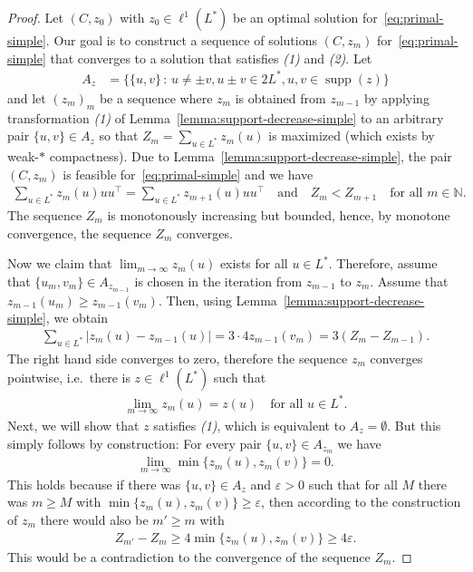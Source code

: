 \documentclass{amsart}
\newcommand{\N}{\mathbb{N}}
\DeclareMathOperator{\supp}{supp}
\begin{document}
\begin{proof}
	Let 
	$ (C,z_0) $ with $ z_0 \in \ell^1(L^*) $ be an optimal solution for~\eqref{eq:primal-simple}.
	Our goal is to construct a sequence of solutions $ (C,z_m) $ for~\eqref{eq:primal-simple} that converges to a solution that satisfies \textit{(1)} and \textit{(2)}.
	Let
	\begin{align}\label{eq:A_z-B_z}
		A_z &=  \{  \{u,v \} \,   : \, u \neq \pm v, u \pm v \in 2L^*, u,v \in \supp(z)  \}
	\end{align}
	and let $ (z_m)_m $ be a sequence where $ z_m $ is obtained from $ z_{m-1} $ by applying transformation \textit{(1)} of Lemma~\ref{lemma:support-decrease-simple} to an arbitrary pair $ \{u,v\} \in A_z $ so that $Z_m = \sum_{u \in L^*} z_m(u) $ is maximized (which exists by weak-$*$ compactness). 
	Due to Lemma~\ref{lemma:support-decrease-simple}, the pair $ (C,z_m) $ is feasible for~\eqref{eq:primal-simple} and we have
	\begin{align*}
		\sum_{u \in L^*} z_m(u) uu^\mathsf{\top} = \sum_{u \in L^*} z_{m+1}(u) uu^\mathsf{\top} \quad \text{and} \quad
		Z_m  < Z_{m+1} \quad \text{for all } m \in \N.
	\end{align*}
	The sequence $ Z_m $ is monotonously increasing but bounded, hence, by monotone convergence, the sequence $ Z_m $ converges.

	Now we claim that $ \lim_{m \to \infty} z_m(u) $ exists for all $ u \in L^* $.
	Therefore, assume that $ \{u_m,v_m\} \in A_{z_{m-1}} $ is chosen in the iteration from $ z_{m-1} $ to $ z_m $.
	Assume that $ z_{m-1}(u_m) \ge  z_{m-1}(v_m)$.
	Then, using Lemma~\ref{lemma:support-decrease-simple}, we obtain
	\begin{align*}
		\sum_{u \in L^*}| z_{m}(u) - z_{m-1}(u) | =3\cdot 4z_{m-1}(v_m) = 3(Z_m - Z_{m-1}).
	\end{align*}
	The right hand side converges to zero, therefore the sequence $ z_m $ converges pointwise, i.e.\ there is $ z \in \ell^1(L^*) $ such that
	\begin{align*}
		\lim_{m \to \infty} z_m(u) = z(u)  \quad \text{for all } u \in L^*.
	\end{align*}
	Next, we will show that $ z $ satisfies \textit{(1)}, which is equivalent to $ A_z = \emptyset $. But this simply follows by construction:
	For every pair $ \{u,v\} \in A_{z_m}  $ we have
	\begin{align*}
		\lim_{m \to \infty} \min \{ z_m(u), z_m(v) \} = 0.
	\end{align*}
	This holds because if there was $ \{u,v\} \in A_z  $ and $ \varepsilon > 0 $ such that for all $ M $ there was $ m \ge M$
	with $ \min \{ z_m(u), z_m(v) \} \ge \varepsilon$, then according to the construction of $ z_m $ there would also be $ m' \ge m$ with
	\begin{align*}
		Z_{m'} -Z_{m} \ge  4\min \{ z_m(u), z_m(v) \}\ge 4\varepsilon .
	\end{align*}
	This would be a contradiction to the convergence of the sequence $ Z_m $.


\end{proof}
\end{document}

